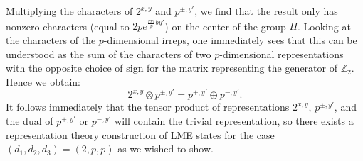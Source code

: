 \documentclass[12pt]{article}
\theoremstyle{definition}
\begin{document}
Multiplying the characters of $2^{x,y}$ and $p^{\pm,y'}$, we find that the result only has nonzero characters (equal to $2pe^{\frac{r \pi i}{p} b y'}$) on the center of the group $H$. Looking at the characters of the $p$-dimensional irreps, one immediately sees that this can be understood as the sum of the characters of two $p$-dimensional representations with the opposite choice of sign for the matrix representing the generator of $\mathbb{Z}_2$. Hence we obtain:
\begin{equation}
2^{x,y}  \otimes p^{\pm,y'} = p^{+,y'} \oplus p^{-,y'}.
\label{singletensorpdt}
\end{equation}
It follows immediately that the tensor product of representations $2^{x,y}$, $p^{\pm,y'}$, and the dual of $p^{+,y'}$ or $p^{-,y'}$ will contain the trivial representation, so there exists a representation theory construction of LME states for the case $(d_1,d_2,d_3) = (2,p,p)$ as we wished to show.
\end{document}
